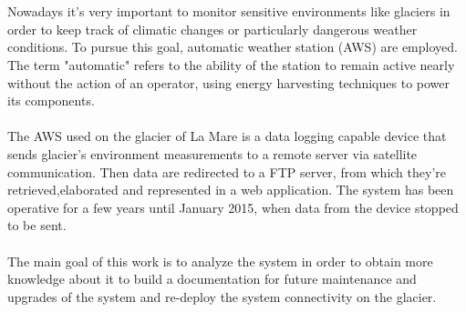 \section*{}
\paragraph{}
Nowadays it's very important to monitor sensitive environments like glaciers in order to keep track of climatic changes or particularly dangerous weather conditions. To pursue this goal, automatic weather station (AWS) are employed. The term "automatic" refers to the ability of the station to remain active nearly without the action of an operator, using energy harvesting techniques to power its components.
\paragraph{}
The AWS used on the glacier of La Mare is a data logging capable device that sends glacier's environment measurements to a remote server via satellite communication. Then data are redirected to a FTP server, from which they're retrieved,elaborated and represented in a web application. The system has been operative for a few years until January 2015, when data from the device stopped to be sent.
\paragraph{}
The main goal of this work is to analyze the system in order to obtain more knowledge about it to build a documentation for future maintenance and upgrades of the system and re-deploy the system connectivity on the glacier.
\clearpage
